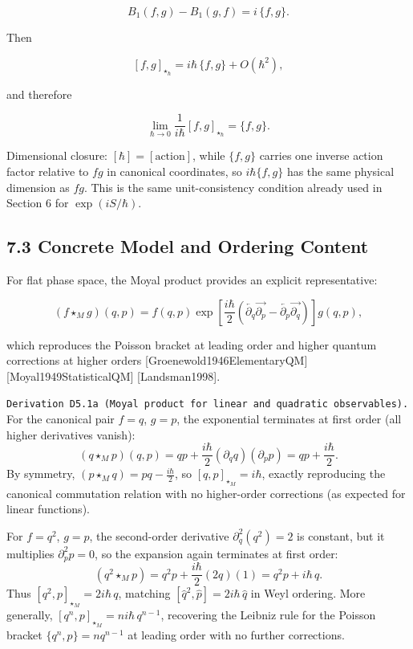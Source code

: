 \documentclass[
]{article}
\begin{document}
\[
B_1(f,g)-B_1(g,f)=i\,\{f,g\}.
\]

Then

\[
[f,g]_{\star_\hbar}
=
i\hbar\,\{f,g\}+O(\hbar^2),
\]

and therefore

\[
\lim_{\hbar\to0}
\frac{1}{i\hbar}[f,g]_{\star_\hbar}
=
\{f,g\}.
\]

Dimensional closure: \([\hbar]=[\text{action}]\), while \(\{f,g\}\)
carries one inverse action factor relative to \(fg\) in canonical
coordinates, so \(i\hbar\{f,g\}\) has the same physical dimension as
\(fg\). This is the same unit-consistency condition already used in
Section 6 for \(\exp(iS/\hbar)\).

\hypertarget{concrete-model-and-ordering-content}{%
\subsection{7.3 Concrete Model and Ordering
Content}\label{concrete-model-and-ordering-content}}

For flat phase space, the Moyal product provides an explicit
representative:

\[
(f\star_M g)(q,p)
=
f(q,p)\exp\!\left[
\frac{i\hbar}{2}
\left(
\overleftarrow{\partial_q}\overrightarrow{\partial_p}
-\overleftarrow{\partial_p}\overrightarrow{\partial_q}
\right)\right]g(q,p),
\]

which reproduces the Poisson bracket at leading order and higher quantum
corrections at higher orders {[}Groenewold1946ElementaryQM{]}
{[}Moyal1949StatisticalQM{]} {[}Landsman1998{]}.

\texttt{Derivation\ D5.1a\ (Moyal\ product\ for\ linear\ and\ quadratic\ observables).}
For the canonical pair \(f=q\), \(g=p\), the exponential terminates at
first order (all higher derivatives vanish): \[
(q\star_M p)(q,p)
=qp+\frac{i\hbar}{2}(\partial_q q)(\partial_p p)
=qp+\frac{i\hbar}{2}.
\] By symmetry, \((p\star_M q)=pq-\frac{i\hbar}{2}\), so
\([q,p]_{\star_M}=i\hbar\), exactly reproducing the canonical
commutation relation with no higher-order corrections (as expected for
linear functions).

For \(f=q^2\), \(g=p\), the second-order derivative
\(\partial_q^2(q^2)=2\) is constant, but it multiplies
\(\partial_p^2 p=0\), so the expansion again terminates at first order:
\[
(q^2\star_M p)=q^2p+\frac{i\hbar}{2}(2q)(1)=q^2p+i\hbar\,q.
\] Thus \([q^2,p]_{\star_M}=2i\hbar\,q\), matching
\([\hat q^2,\hat p]=2i\hbar\,\hat q\) in Weyl ordering. More generally,
\([q^n,p]_{\star_M}=ni\hbar\,q^{n-1}\), recovering the Leibniz rule for
the Poisson bracket \(\{q^n,p\}=nq^{n-1}\) at leading order with no
further corrections.
\end{document}
